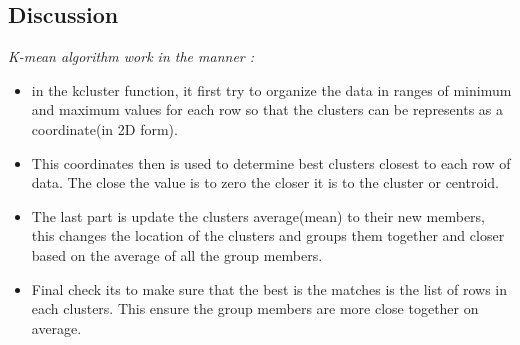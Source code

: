 \documentclass[12pt]{article}
\begin{document}
\subsection*{Discussion}
\emph{K-mean algorithm work in the manner :}
    \begin{itemize}
        \item in the kcluster function, it first try to organize the data in ranges of minimum and maximum values for each row so that the clusters can be represents as a coordinate(in 2D form).
        \item This coordinates then is used to determine best  clusters closest to each row of data. The close the value is to zero the closer it is to the cluster or centroid.
        \item The last part is update the clusters average(mean) to their new members, this changes the location of the clusters and groups them together and closer based on the average of all the group members.
        \item Final check its to make sure that the best is the matches is the list of rows in each clusters. This ensure the group members are more close together on
        average.
        

\end{itemize}
\end{document}
